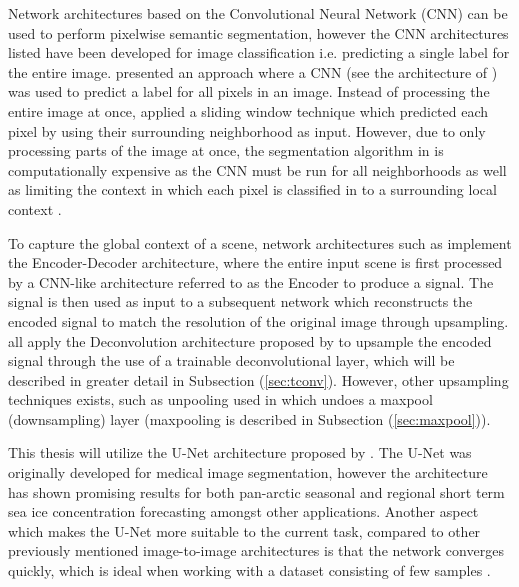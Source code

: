 \documentclass[../main/thesis.tex]{subfiles}
\begin{document}
Network architectures based on the Convolutional Neural Network (CNN) \citep{LeCun1989,Ciresan2012,Krizhevsky2012,Simonyan2014,Szegedy2014,He2015a,Huang2016} can be used to perform pixelwise semantic segmentation, however the CNN architectures listed have been developed for image classification i.e. predicting a single label for the entire image. \citet{Ciresan2012a} presented an approach where a CNN (see the architecture of \citet{Ciresan2012}) was used to predict a label for all pixels in an image. Instead of processing the entire image at once, \citet{Ciresan2012a} applied a sliding window technique which predicted each pixel by using their surrounding neighborhood as input. However, due to only processing parts of the image at once, the segmentation algorithm in \citet{Ciresan2012a} is computationally expensive as the CNN must be run for all neighborhoods as well as limiting the context in which each pixel is classified in to a surrounding local context \citep{Ronneberger2015}.

To capture the global context of a scene, network architectures such as \citet{Long2015,Noh2015,Ronneberger2015,Badrinarayanan2017,Chen2018} implement the Encoder-Decoder architecture, where the entire input scene is first processed by a CNN-like architecture referred to as the Encoder to produce a signal. The signal is then used as input to a subsequent network which reconstructs the encoded signal to match the resolution of the original image through upsampling. \citet{Long2015,Ronneberger2015,Badrinarayanan2017} all apply the Deconvolution architecture proposed by \citet{Zeiler2010} to upsample the encoded signal through the use of a trainable deconvolutional layer, which will be described in greater detail in Subsection (\ref{sec:tconv}). However, other upsampling techniques exists, such as unpooling used in \citet{Noh2015} which undoes a maxpool (downsampling) layer (maxpooling is described in Subsection (\ref{sec:maxpool})).

This thesis will utilize the U-Net architecture proposed by \citet{Ronneberger2015}. The U-Net was originally developed for medical image segmentation, however the architecture has shown promising results for both pan-arctic seasonal \citep{Andersson2021} and regional short term \citep{Grigoryev2022} sea ice concentration forecasting amongst other applications. Another aspect which makes the U-Net more suitable to the current task, compared to other previously mentioned image-to-image architectures is that the network converges quickly, which is ideal when working with a dataset consisting of few samples \citep{Ronneberger2015}.
\end{document}
